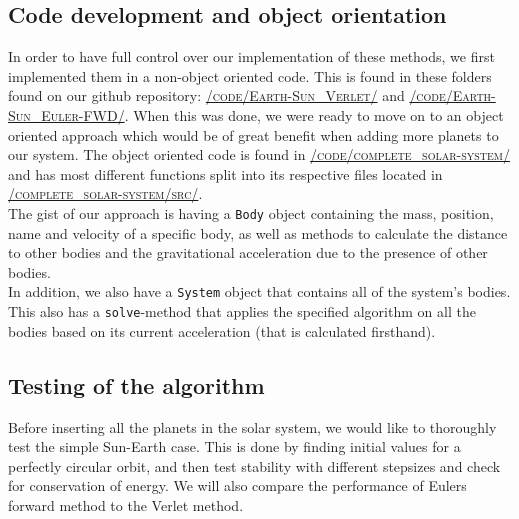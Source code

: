 \documentclass[../main.tex]{subfiles}
\begin{document}
\subsection{Code development and object orientation}
In order to have full control over our implementation of these methods, we first implemented them in a non-object oriented code. This is found in these folders found on our github repository\cite{repository}: \href{https://github.com/kmaasrud/Project-5/blob/master/code/Earth-Sun_Verlet/}{\textsc{/code/Earth-Sun\_Verlet/}} and \href{https://github.com/kmaasrud/Project-5/blob/master/code/Earth-Sun_Euler-FWD/}{\textsc{/code/Earth-Sun\_Euler-FWD/}}. When this was done, we were ready to move on to an object oriented approach which would be of great benefit when adding more planets to our system.
The object oriented code is found in \href{https://github.com/kmaasrud/Project-5/blob/master/code/complete_solar-system/}{\textsc{/code/complete\_solar-system/}} and has most different functions split into its respective files located in \href{https://github.com/kmaasrud/Project-5/blob/master/code/complete_solar-system/src/}{\textsc{/complete\_solar-system/src/}}. \\
The gist of our approach is having a \verb+Body+ object containing the mass, position, name and velocity of a specific body, as well as methods to calculate the distance to other bodies and the gravitational acceleration due to the presence of other bodies. \\
In addition, we also have a \verb+System+ object that contains all of the system's bodies. This also has a \verb+solve+-method that applies the specified algorithm on all the bodies based on its current acceleration (that is calculated firsthand). \\


\subsection{Testing of the algorithm}
Before inserting all the planets in the solar system, we would like to thoroughly test the simple Sun-Earth case. This is done by finding initial values for a perfectly circular orbit, and then test stability with different stepsizes and check for conservation of energy. We will also compare the performance of Eulers forward method to the Verlet method.
\end{document}
